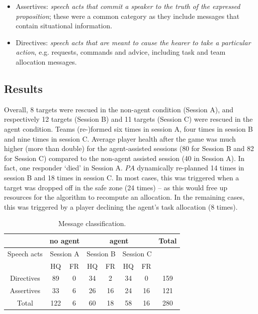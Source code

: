 \begin{itemize}
\item Assertives: \textit{speech acts that commit a speaker to the truth of the expressed proposition}; these were a common category as they include messages that contain situational information.
\item Directives: \textit{speech acts that are meant to cause the hearer to take a particular action}, e.g. requests, commands and advice, including task and team allocation messages. 
\end{itemize}

\subsection{Results}
\noindent Overall, 8 targets were rescued in the non-agent condition (Session A), and respectively 12 targets (Session B) and 11 targets (Session C) were rescued in the agent condition. Teams (re-)formed six times in session A, four times in session B and nine times  in session C. Average player health after the game was much higher (more than double) for the agent-assisted sessions (80 for Session B and 82 for Session C) compared to the non-agent assisted session (40 in Session A). In fact, one responder `died' in Session A.
$PA$ dynamically re-planned 14 times in session B and 18 times in session C. In most cases, this was triggered when a target was dropped off in the safe zone (24 times) -- as this would free up resources for the algorithm to recompute an allocation. In the remaining cases, this was triggered by a player declining the agent's task allocation (8 times). 



\begin{table}[htbp]\footnotesize
\begin{tabular}{c | c c | c c c c | c}
 & \multicolumn{2}{c|}{no agent} &  \multicolumn{4}{c|}{agent} & Total \\
 \hline
 Speech acts & \multicolumn{2}{c|}{Session A} & \multicolumn{2}{c}{Session B} & \multicolumn{2}{c|}{Session C} & \\
  & HQ & FR & HQ & FR & HQ & FR & \\
  \hline
  Directives & 89 & 0 & 34 & 2 & 34 & 0 & 159 \\
  Assertives & 33 & 6 & 26 & 16 & 24 & 16 & 121 \\
  \hline
  Total & 122 & 6 & 60 & 18 & 58 & 16 & 280 \\
\end{tabular}
\vspace{-2mm}
 \caption{Message classification.} \label{tab:msgs}
\end{table}\vspace{-2mm}

